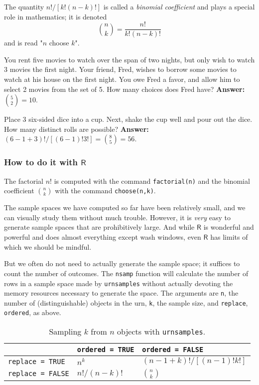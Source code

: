 The quantity \(n!/[k!(n-k)!]\) is called a \emph{binomial coefficient} and
plays a special role in mathematics; it is denoted  
\begin{equation}
\label{eq-binomial-coefficient}
{n \choose k}=\frac{n!}{k!(n-k)!}
\end{equation}
and is read "\(n\) choose \(k\)".


You rent five movies to watch over the span of two nights, but only
wish to watch 3 movies the first night. Your friend, Fred, wishes to
borrow some movies to watch at his house on the first night. You owe
Fred a favor, and allow him to select 2 movies from the set of 5. How
many choices does Fred have? \textbf{Answer:} \({5 \choose 2}=10\).



Place 3 six-sided dice into a cup. Next, shake the cup well and pour
out the dice. How many distinct rolls are possible? \textbf{Answer:}
\((6-1+3)!/[(6-1)!3!]={8 \choose 5}=56\).

\subsubsection{How to do it with \(\mathsf{R}\)}
\label{sec-4-5-2-1}

The factorial \(n!\) is computed with the command \texttt{factorial(n)} and
the binomial coefficient \({n \choose k}\) with the command
\texttt{choose(n,k)}.

The sample spaces we have computed so far have been relatively small,
and we can visually study them without much trouble. However, it is
\emph{very} easy to generate sample spaces that are prohibitively
large. And while \(\mathsf{R}\) is wonderful and powerful and does
almost everything except wash windows, even \(\mathsf{R}\) has limits
of which we should be mindful.

But we often do not need to actually generate the sample space; it
suffices to count the number of outcomes. The \texttt{nsamp} function will
calculate the number of rows in a sample space made by \texttt{urnsamples}
without actually devoting the memory resources necessary to generate
the space. The arguments are \texttt{n}, the number of (distinguishable)
objects in the urn, \texttt{k}, the sample size, and \texttt{replace}, \texttt{ordered}, as
above.

\begin{table}[htb]
\caption[Sampling \(k\) from \(n\) objects with \texttt{urnsamples}]{\label{tab-Sampling-k-from-n}Sampling \(k\) from \(n\) objects with \texttt{urnsamples}.}
\centering
\begin{tabular}{lll}
 & \texttt{ordered = TRUE} & \texttt{ordered = FALSE}\\
\hline
\texttt{replace = TRUE} & \(n^{k}\) & \((n-1+k)! / [(n-1)!k!]\)\\
\texttt{replace = FALSE} & \( n! / (n-k)! \) & \( {n \choose k} \)\\
\hline
\end{tabular}
\end{table}




